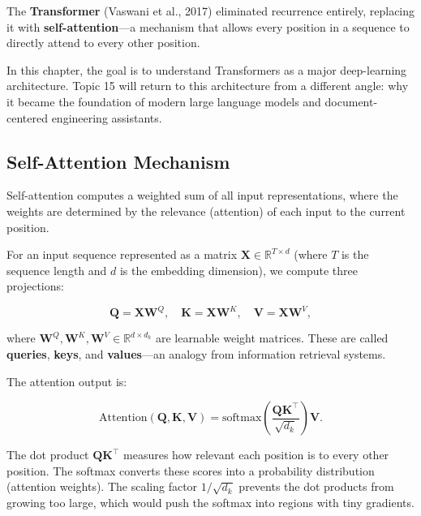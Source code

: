 \documentclass[12pt]{article}
\begin{document}
The \textbf{Transformer} (Vaswani et al., 2017) eliminated recurrence entirely, replacing it with \textbf{self-attention}---a mechanism that allows every position in a sequence to directly attend to every other position.

In this chapter, the goal is to understand Transformers as a major deep-learning architecture. Topic 15 will return to this architecture from a different angle: why it became the foundation of modern large language models and document-centered engineering assistants.

\subsection{Self-Attention Mechanism}

Self-attention computes a weighted sum of all input representations, where the weights are determined by the relevance (attention) of each input to the current position.

For an input sequence represented as a matrix $\mathbf{X} \in \mathbb{R}^{T \times d}$ (where $T$ is the sequence length and $d$ is the embedding dimension), we compute three projections:

\begin{equation}
    \mathbf{Q} = \mathbf{X}\mathbf{W}^Q, \quad
    \mathbf{K} = \mathbf{X}\mathbf{W}^K, \quad
    \mathbf{V} = \mathbf{X}\mathbf{W}^V,
    \label{t13eq:qkv}
\end{equation}

where $\mathbf{W}^Q, \mathbf{W}^K, \mathbf{W}^V \in \mathbb{R}^{d \times d_k}$ are learnable weight matrices. These are called \textbf{queries}, \textbf{keys}, and \textbf{values}---an analogy from information retrieval systems.

The attention output is:

\begin{equation}
    \text{Attention}(\mathbf{Q}, \mathbf{K}, \mathbf{V}) = \text{softmax}\!\left(\frac{\mathbf{Q}\mathbf{K}^\top}{\sqrt{d_k}}\right)\mathbf{V}.
    \label{t13eq:attention}
\end{equation}

The dot product $\mathbf{Q}\mathbf{K}^\top$ measures how relevant each position is to every other position. The softmax converts these scores into a probability distribution (attention weights). The scaling factor $1/\sqrt{d_k}$ prevents the dot products from growing too large, which would push the softmax into regions with tiny gradients.
\end{document}
